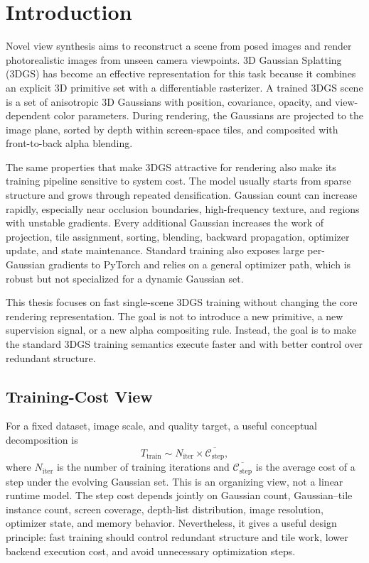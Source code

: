 \chapter{Introduction}
\label{chap:introduction}

Novel view synthesis aims to reconstruct a scene from posed images and render photorealistic images from unseen camera viewpoints. 3D Gaussian Splatting (3DGS) has become an effective representation for this task because it combines an explicit 3D primitive set with a differentiable rasterizer. A trained 3DGS scene is a set of anisotropic 3D Gaussians with position, covariance, opacity, and view-dependent color parameters. During rendering, the Gaussians are projected to the image plane, sorted by depth within screen-space tiles, and composited with front-to-back alpha blending.

The same properties that make 3DGS attractive for rendering also make its training pipeline sensitive to system cost. The model usually starts from sparse structure and grows through repeated densification. Gaussian count can increase rapidly, especially near occlusion boundaries, high-frequency texture, and regions with unstable gradients. Every additional Gaussian increases the work of projection, tile assignment, sorting, blending, backward propagation, optimizer update, and state maintenance. Standard training also exposes large per-Gaussian gradients to PyTorch and relies on a general optimizer path, which is robust but not specialized for a dynamic Gaussian set.

This thesis focuses on fast single-scene 3DGS training without changing the core rendering representation. The goal is not to introduce a new primitive, a new supervision signal, or a new alpha compositing rule. Instead, the goal is to make the standard 3DGS training semantics execute faster and with better control over redundant structure.

\section{Training-Cost View}

For a fixed dataset, image scale, and quality target, a useful conceptual decomposition is
\begin{equation}
T_{\mathrm{train}}
\sim
N_{\mathrm{iter}}
\times
\overline{\mathcal{C}_{\mathrm{step}}},
\end{equation}
where $N_{\mathrm{iter}}$ is the number of training iterations and $\overline{\mathcal{C}_{\mathrm{step}}}$ is the average cost of a step under the evolving Gaussian set. This is an organizing view, not a linear runtime model. The step cost depends jointly on Gaussian count, Gaussian--tile instance count, screen coverage, depth-list distribution, image resolution, optimizer state, and memory behavior. Nevertheless, it gives a useful design principle: fast training should control redundant structure and tile work, lower backend execution cost, and avoid unnecessary optimization steps.

